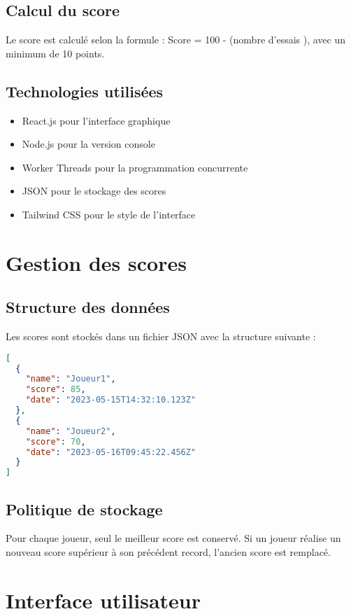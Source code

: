 \documentclass{article}
\begin{document}
\subsection{Calcul du score}
Le score est calculé selon la formule : Score = 100 - (nombre d'essais ), avec un minimum de 10 points.


\subsection{Technologies utilisées}
\begin{itemize}
    \item React.js pour l'interface graphique
    \item Node.js pour la version console
    \item Worker Threads pour la programmation concurrente
    \item JSON pour le stockage des scores
    \item Tailwind CSS pour le style de l'interface
\end{itemize}

\section{Gestion des scores}

\subsection{Structure des données}
Les scores sont stockés dans un fichier JSON avec la structure suivante :
\begin{lstlisting}[language=JSON, caption=Structure du fichier scores.json]
[
  {
    "name": "Joueur1",
    "score": 85,
    "date": "2023-05-15T14:32:10.123Z"
  },
  {
    "name": "Joueur2",
    "score": 70,
    "date": "2023-05-16T09:45:22.456Z"
  }
]
\end{lstlisting}

\subsection{Politique de stockage}
Pour chaque joueur, seul le meilleur score est conservé. Si un joueur réalise un nouveau score supérieur à son précédent record, l'ancien score est remplacé.

\section{Interface utilisateur}
\end{document}
